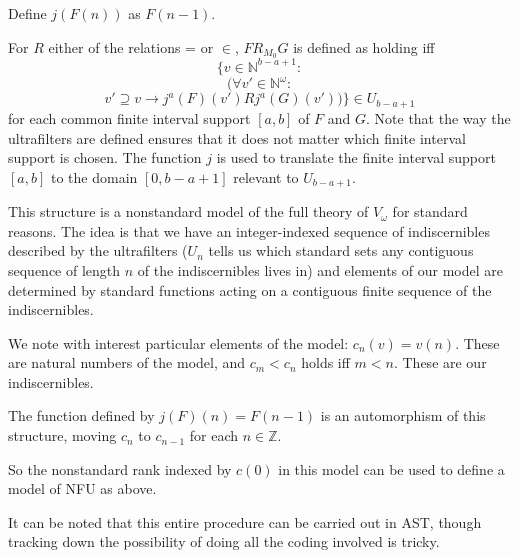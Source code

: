 \documentclass{slides}
\begin{document}
\begin{slide}

Define $j(F(n))$ as $F(n-1)$.

For $R$ either of the relations = or $\in$, $F R_{M_0} G$ is defined as holding iff $$\{v \in \mathbb N^{b-a+1}:$$ $$(\forall v' \in \mathbb N^\omega:$$ $$  v' \supseteq v \rightarrow j^a(F)(v') R j^a(G)(v'))\} \in U_{b-a+1}$$ for each common finite interval support $[a,b]$ of $F$ and $G$.  Note that the way the ultrafilters are defined ensures that it does not matter which finite interval support is chosen.  The function $j$ is used to translate the finite interval support $[a,b]$ to the domain $[0,b-a+1]$ relevant to $U_{b-a+1}$.
\end{slide}

\begin{slide}

This structure is a nonstandard model of the full theory of $V_\omega$ for standard reasons.  The idea is that
we have an integer-indexed sequence of indiscernibles described by the ultrafilters ($U_n$ tells us which standard sets
any contiguous sequence of length $n$ of the indiscernibles lives in) and elements of our model are determined
by standard functions acting on a contiguous finite sequence of the indiscernibles.

\end{slide}

\begin{slide}

We note with interest particular elements of the model:  $c_n(v) = v(n)$.  These are natural numbers of the model,
and $c_m < c_n$ holds iff $m<n$.  These are our indiscernibles.

The function defined by $j(F)(n) = F(n-1)$ is an automorphism of this structure, moving $c_n$ to $c_{n-1}$ for each $n \in \mathbb Z$.

So the nonstandard rank indexed by $c(0)$ in this model can be used to define a model of NFU as above.

It can be noted that this entire procedure can be carried out in AST, though tracking down the possibility of doing all the coding involved is tricky.

\end{slide}
\end{document}
